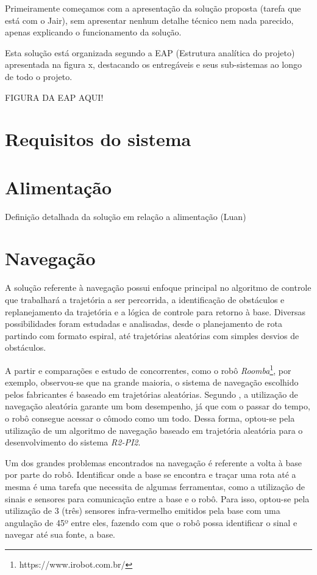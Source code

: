 Primeiramente começamos com a apresentação da solução proposta (tarefa que está com o Jair), sem apresentar nenhum detalhe técnico nem nada parecido, apenas explicando o funcionamento da solução. 

Esta solução está organizada segundo a EAP (Estrutura analítica do projeto) apresentada na figura x, destacando os entregáveis e seus sub-sistemas ao longo de todo o projeto.

FIGURA DA EAP AQUI!

\section{Requisitos do sistema} %
\label{sub:requisitos_do_sistema}

\section{Alimentação} %
\label{sub:alimentação}
	Definição detalhada da solução em relação a alimentação (Luan)

\section{Navegação} %
\label{sub:automação}
	A solução referente à navegação possui enfoque principal no algoritmo de controle que trabalhará a trajetória a ser percorrida, a identificação de obstáculos e replanejamento da trajetória e a lógica de controle para retorno à base. Diversas possibilidades foram estudadas e analisadas, desde o planejamento de rota partindo com formato espiral, até trajetórias aleatórias com simples desvios de obstáculos.

	A partir e comparações e estudo de concorrentes, como o robô \textit{Roomba}\footnote{https://www.irobot.com.br/}, por exemplo, observou-se que na grande maioria, o sistema de navegação escolhido pelos fabricantes é baseado em trajetórias aleatórias. Segundo \cite{robo_limpeza_domesti}, a utilização de navegação aleatória garante um bom desempenho, já que com o passar do tempo, o robô consegue acessar o cômodo como um todo. Dessa forma, optou-se pela utilização de um algoritmo de navegação baseado em trajetória aleatória para o desenvolvimento do sistema \textit{R2-PI2}.

	Um dos grandes problemas encontrados na navegação é referente a volta à base por parte do robô. Identificar onde a base se encontra e traçar uma rota até a mesma é uma tarefa que necessita de algumas ferramentas, como a utilização de sinais e sensores para comunicação entre a base e o robô. Para isso, optou-se pela utilização de 3 (três) sensores infra-vermelho emitidos pela base com uma angulação de 45º entre eles, fazendo com que o robô possa identificar o sinal e navegar até sua fonte, a base.

